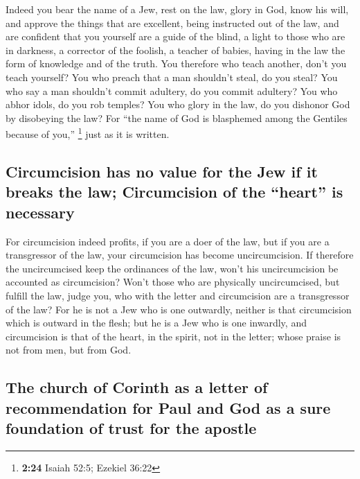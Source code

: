  Indeed you bear the name of a Jew, rest on the law,
glory in God,  know his will, and approve the things that
are excellent, being instructed out of the law,  and are
confident that you yourself are a guide of the blind, a light to those
who are in darkness,  a corrector of the foolish, a
teacher of babies, having in the law the form of knowledge and of the
truth.  You therefore who teach another, don't you teach
yourself? You who preach that a man shouldn't steal, do you steal?
 You who say a man shouldn't commit adultery, do you
commit adultery? You who abhor idols, do you rob temples?
 You who glory in the law, do you dishonor God by
disobeying the law?  For ``the name of God is blasphemed
among the Gentiles because of you,'' \footnote{\textbf{2:24} Isaiah
  52:5; Ezekiel 36:22} just as it is written.

\hypertarget{circumcision-has-no-value-for-the-jew-if-it-breaks-the-law-circumcision-of-the-heart-is-necessary}{%
\subsection{Circumcision has no value for the Jew if it breaks the law;
Circumcision of the ``heart'' is
necessary}\label{circumcision-has-no-value-for-the-jew-if-it-breaks-the-law-circumcision-of-the-heart-is-necessary}}

 For circumcision indeed profits, if you are a doer of
the law, but if you are a transgressor of the law, your circumcision has
become uncircumcision.  If therefore the uncircumcised
keep the ordinances of the law, won't his uncircumcision be accounted as
circumcision?  Won't those who are physically
uncircumcised, but fulfill the law, judge you, who with the letter and
circumcision are a transgressor of the law?  For he is
not a Jew who is one outwardly, neither is that circumcision which is
outward in the flesh;  but he is a Jew who is one
inwardly, and circumcision is that of the heart, in the spirit, not in
the letter; whose praise is not from men, but from God.

\hypertarget{the-church-of-corinth-as-a-letter-of-recommendation-for-paul-and-god-as-a-sure-foundation-of-trust-for-the-apostle}{%
\subsection{The church of Corinth as a letter of recommendation for Paul
and God as a sure foundation of trust for the
apostle}\label{the-church-of-corinth-as-a-letter-of-recommendation-for-paul-and-god-as-a-sure-foundation-of-trust-for-the-apostle}}

